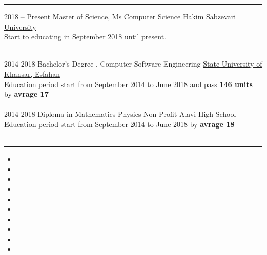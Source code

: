 \documentclass[8pt]{developercv}
\begin{document}
\noindent\rule{\textwidth}{1pt}
\vspace{-\baselineskip} 



\vspace{5pt} 

\begin{entrylist}
	\entry
	{2018 -- Present}
	{Master of Science, Ms Computer Science}
	{\href{http://www.hsu.ac.ir/en/}{Hakim Sabzevari University\\}}
	{Start to educating in September 2018 until present.\\\\}

	\entry
	{2014-2018}
	{Bachelor's Degree , Computer Software Engineering}
	{\href{http://khansar-cmc.ac.ir/}{State University of Khansar, Esfahan\\}}
	{Education period start from September 2014 to June 2018 and pass \textbf{146 units} by \textbf{avrage 17}\\\\}
\entry
	{2014-2018}
	{Diploma in Mathematics Physics}
	{Non-Profit Alavi High School\\}
	{Education period start from September 2014 to June 2018 by \textbf{avrage 18}\\\\}

\end{entrylist}


\vspace{35pt} 
\noindent\rule{\textwidth}{1pt}


\vspace{10pt} 

\begin{minipage}[t]{0.6\textwidth}

	\begin{itemize}

		\item {}
		\item {}
		\item {}
		\item {}
		\item {}
		\item {}
		\item {}
		\item {}
		\item {}
		\item {}
	\end{itemize}



\end{minipage}
\end{document}
